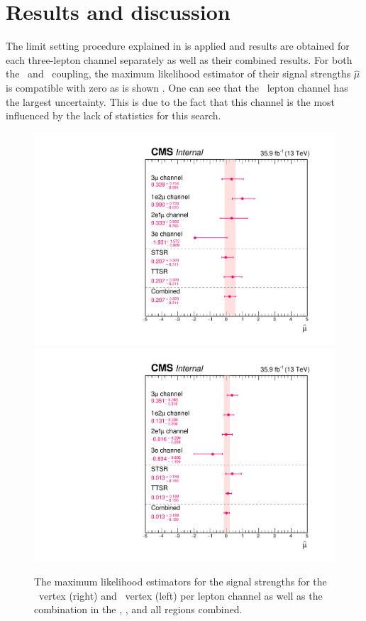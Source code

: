 \newpage
\section{Results and discussion}
\label{sec:Result}
The limit setting procedure explained in  is applied and results are obtained for each three-lepton channel separately as well as their combined results. For both the \Zut\ and \Zct\ coupling, the maximum likelihood estimator of their signal strengths $\hat{\mu}$ is compatible with zero as is shown . One can see that the \eee\ lepton channel has the largest uncertainty. This is due to the fact that this channel is the most influenced by the lack of statistics for this search.
\begin{figure}[htbp] %
	\centering
	\includegraphics[width=0.49\linewidth]{6_Search/Figures/MLE/MLEZut.pdf}
	\includegraphics[width=0.49\linewidth]{6_Search/Figures/MLE/MLEZct.pdf}
	\caption{The maximum likelihood estimators for the signal strengths for the \Zut\ vertex (right) and \Zct\ vertex (left) per lepton channel as well as the combination in the \STSR, \TTSR, and all regions combined. }
	\label{fig:mlezut}
\end{figure}

